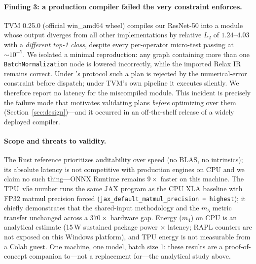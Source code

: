 \paragraph{Finding 3: a production compiler failed the very constraint
\gate{} enforces.}
TVM 0.25.0 (official win\_amd64 wheel) compiles our ResNet-50 into a
module whose output diverges from all other implementations by
relative $L_2$ of $1.24$--$4.03$ with a \emph{different top-1 class},
despite every per-operator micro-test passing at ${\sim}10^{-7}$. We
isolated a minimal reproduction: any graph containing more than one
\texttt{BatchNormalization} node is lowered incorrectly, while the
imported Relax IR remains correct. Under \gate{}'s protocol such a
plan is rejected by the numerical-error constraint before dispatch;
under TVM's own pipeline it executes silently. We therefore report no
latency for the miscompiled module. This incident is precisely the
failure mode that motivates validating plans \emph{before} optimizing
over them (Section~\ref{sec:design})---and it occurred in an
off-the-shelf release of a widely deployed compiler.

\paragraph{Scope and threats to validity.}
The Rust reference prioritizes auditability over speed (no BLAS, no
intrinsics); its absolute latency is not competitive with production
engines on CPU and we claim no such thing---ONNX Runtime remains
$9\times$ faster on this machine. The TPU~v5e number runs the same JAX
program as the CPU XLA baseline with FP32 matmul precision forced
(\texttt{jax\_default\_matmul\_precision = highest}); it chiefly
demonstrates that the shared-input methodology and the $m_5$ metric
transfer unchanged across a $370\times$ hardware gap. Energy ($m_4$)
on CPU is an analytical estimate (15\,W sustained package power
$\times$ latency; RAPL counters are not exposed on this Windows
platform), and TPU energy is not measurable from a Colab guest. One
machine, one model, batch size 1: these results are a proof-of-concept
companion to---not a replacement for---the analytical study above.

